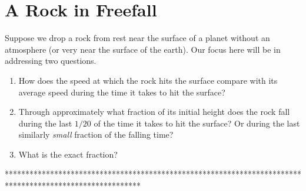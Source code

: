 \documentclass{ximera}
\begin{document}
\section{A Rock in Freefall}
Suppose we drop a rock from rest near the surface of a planet without an atmosphere (or very near the surface of the earth). Our focus here will be in addressing two questions.

\begin{question} \label{Q54rghgeyghhg}

\begin{enumerate}
\item How does the speed at which the rock hits the surface compare with its average speed during the time it takes to hit the surface?

\item Through approximately what fraction of its initial height does the rock fall during the last $1/20$ of the time it takes to hit the surface? Or during the  last similarly \emph{small} fraction of the falling time? 
\item What is the exact fraction? 
\end{enumerate}
\end{question}



\iffalse

*********************************************************************************************************
\end{document}
